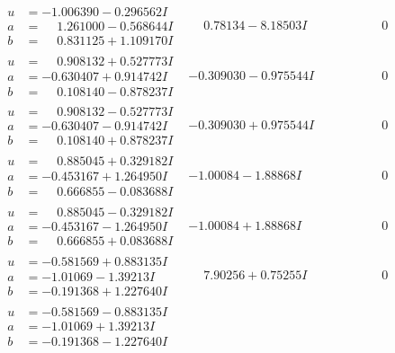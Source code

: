 \documentclass[1p]{elsarticle_modified}
\theoremstyle{definition}
\begin{document}
$$\begin{array}{c|c|c}
\begin{aligned}
u &= -1.006390 - 0.296562 I \\
a &= \phantom{-}1.261000 - 0.568644 I \\
b &= \phantom{-}0.831125 + 1.109170 I\end{aligned}
 & \phantom{-}0.78134 - 8.18503 I & \phantom{-0.000000 } 0 \\ \hline\begin{aligned}
u &= \phantom{-}0.908132 + 0.527773 I \\
a &= -0.630407 + 0.914742 I \\
b &= \phantom{-}0.108140 - 0.878237 I\end{aligned}
 & -0.309030 - 0.975544 I & \phantom{-0.000000 } 0 \\ \hline\begin{aligned}
u &= \phantom{-}0.908132 - 0.527773 I \\
a &= -0.630407 - 0.914742 I \\
b &= \phantom{-}0.108140 + 0.878237 I\end{aligned}
 & -0.309030 + 0.975544 I & \phantom{-0.000000 } 0 \\ \hline\begin{aligned}
u &= \phantom{-}0.885045 + 0.329182 I \\
a &= -0.453167 + 1.264950 I \\
b &= \phantom{-}0.666855 - 0.083688 I\end{aligned}
 & -1.00084 - 1.88868 I & \phantom{-0.000000 } 0 \\ \hline\begin{aligned}
u &= \phantom{-}0.885045 - 0.329182 I \\
a &= -0.453167 - 1.264950 I \\
b &= \phantom{-}0.666855 + 0.083688 I\end{aligned}
 & -1.00084 + 1.88868 I & \phantom{-0.000000 } 0 \\ \hline\begin{aligned}
u &= -0.581569 + 0.883135 I \\
a &= -1.01069 - 1.39213 I \\
b &= -0.191368 + 1.227640 I\end{aligned}
 & \phantom{-}7.90256 + 0.75255 I & \phantom{-0.000000 } 0 \\ \hline\begin{aligned}
u &= -0.581569 - 0.883135 I \\
a &= -1.01069 + 1.39213 I \\
b &= -0.191368 - 1.227640 I\end{aligned}

\end{array}$$
\end{document}

